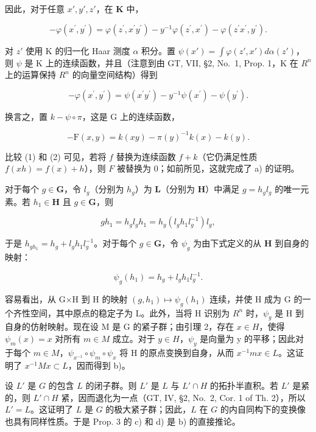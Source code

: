 因此，对于任意 \(x', y', z'\)，在 \(\mathbf{K}\) 中，

\[
- \varphi (x ^ {\prime}, y ^ {\prime}) = \varphi (z ^ {\prime}, x ^ {\prime} y ^ {\prime}) - y ^ {- 1} \varphi (z ^ {\prime}, x ^ {\prime}) - \varphi (z ^ {\prime} x ^ {\prime}, y ^ {\prime}).
\]

对 \(z'\) 使用 K 的归一化 Haar 测度 \(\alpha\) 积分。置 \(\psi(x') = \int \varphi(z', x') d\alpha(z')\)，则 \(\psi\) 是 K 上的连续函数，并且（注意到由 GT, VII, §2, No.~1, Prop. 1，K 在 \(R^{n}\) 上的运算保持 \(R^{n}\) 的向量空间结构）得到

\[
- \varphi (x ^ {\prime}, y ^ {\prime}) = \psi (x ^ {\prime} y ^ {\prime}) - y ^ {- 1} \psi (x ^ {\prime}) - \psi (y ^ {\prime}).
\]

换言之，置 \(k - \psi \circ \pi\)，这是 G 上的连续函数，

\[
- \mathrm{F} (x, y) = k (x y) - \pi (y) ^ {- 1} k (x) - k (y).\tag{2}
\]

比较 (1) 和 (2) 可见，若将 \(f\) 替换为连续函数 \(f + k\)（它仍满足性质 \(f(xh) = f(x) + h\)），则 \(F\) 被替换为 0；如前所见，这就完成了 a) 的证明。

对于每个 \(g \in \mathbf{G}\)，令 \(l_g\)（分别为 \(h_g\)）为 \(\mathbf{L}\)（分别为 \(\mathbf{H}\)）中满足 \(g = h_g l_g\) 的唯一元素。若 \(h_1 \in \mathbf{H}\) 且 \(g \in \mathbf{G}\)，则

\[
g h _ {1} = h _ {g} l _ {g} h _ {1} = h _ {g} (l _ {g} h _ {1} l _ {g} ^ {- 1}) l _ {g},
\]

于是 \(h_{gh_1} = h_g + l_g h_1 l_g^{-1}\)。对于每个 \(g \in \mathbf{G}\)，令 \(\psi_g\) 为由下式定义的从 \(\mathbf{H}\) 到自身的映射：

\[
\psi_ {g} (h _ {1}) = h _ {g} + l _ {g} h _ {1} l _ {g} ^ {- 1}.
\]

容易看出，从 G×H 到 H 的映射 \((g,h_{1})\mapsto\psi_{g}(h_{1})\) 连续，并使 H 成为 G 的一个齐性空间，其中原点的稳定子为 L。此外，当将 H 识别为 \(R^{n}\) 时，\(\psi_{g}\) 是 H 到自身的仿射映射。现在设 M 是 G 的紧子群；由引理 2，存在 \(x\in H\)，使得 \(\psi_{m}(x)=x\) 对所有 \(m\in M\) 成立。对于 \(y\in H\)，\(\psi_{y}\) 是向量为 y 的平移；因此对于每个 \(m\in M\)，\(\psi_{x^{-1}}\circ\psi_{m}\circ\psi_{x}\) 将 H 的原点变换到自身，从而 \(x^{-1}mx\in L\)。这证明了 \(x^{-1}Mx\subset L\)，因而得到 b)。

设 \(L'\) 是 \(G\) 的包含 \(L\) 的闭子群。则 \(L'\) 是 \(L\) 与 \(L' \cap H\) 的拓扑半直积。若 \(L'\) 是紧的，则 \(L' \cap H\) 紧，因而退化为一点（GT, IV, §2, No.~2, Cor. 1 of Th. 2），所以 \(L' = L\)。这证明了 \(L\) 是 \(G\) 的极大紧子群；因此，\(L\) 在 \(G\) 的内自同构下的变换像也具有同样性质。于是 Prop. 3 的 c) 和 d) 是 b) 的直接推论。

